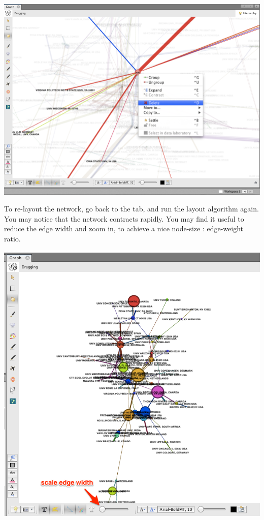 \documentclass[letterpaper,10pt,english]{sphinxmanual}
\begin{document}
{\hfill\includegraphics{coauthors.28.png}\hfill}

To re-layout the network, go back to the  tab, and run the layout algorithm
again. You may notice that the network contracts rapidly. You may find it useful to reduce
the edge width and zoom in, to achieve a nice node-size : edge-weight ratio.

{\hfill\includegraphics{coauthors.29.png}\hfill}
\end{document}
